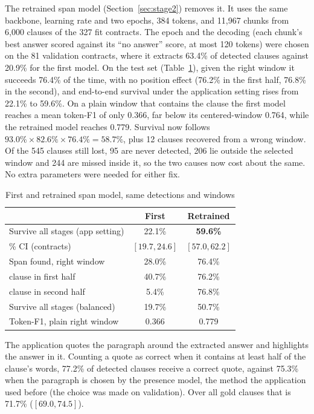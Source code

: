 \documentclass[journal]{IEEEtran}
\begin{document}
The retrained span model (Section~\ref{sec:stage2}) removes it. It uses the same backbone, learning
rate and two epochs, 384 tokens, and 11,967 chunks from 6,000 clauses of the 327 fit contracts. The
epoch and the decoding (each chunk's best answer scored against its ``no answer'' score, at most 120
tokens) were chosen on the 81 validation contracts, where it extracts 63.4\% of detected clauses
against 20.9\% for the first model. On the test set (Table~\ref{tab:spanv2}), given the right window
it succeeds 76.4\% of the time, with no position effect (76.2\% in the first half, 76.8\% in the
second), and end-to-end survival under the application setting rises from 22.1\% to 59.6\%. On a
plain window that contains the clause the first model reaches a mean token-F1 of only 0.366, far
below its centered-window 0.764, while the retrained model reaches 0.779. Survival now follows
$93.0\% \times 82.6\% \times 76.4\% = 58.7\%$, plus 12 clauses recovered from a wrong window. Of
the 545 clauses still lost, 95 are never detected, 206 lie outside the selected window and 244 are
missed inside it, so the two causes now cost about the same. No extra parameters were needed for
either fix.

\begin{table}[!t]
\caption{First and retrained span model, same detections and windows}
\label{tab:spanv2}
\centering
\small
\setlength{\tabcolsep}{4pt}
\begin{tabular}{lcc}
\toprule
 & \textbf{First} & \textbf{Retrained}\\
\midrule
Survive all stages (app setting) & 22.1\% & \textbf{59.6\%}\\
\quad 95\% CI (contracts) & $[19.7, 24.6]$ & $[57.0, 62.2]$\\
Span found, right window & 28.0\% & 76.4\%\\
\quad clause in first half & 40.7\% & 76.2\%\\
\quad clause in second half & 5.4\% & 76.8\%\\
Survive all stages (balanced) & 19.7\% & 50.7\%\\
Token-F1, plain right window & 0.366 & 0.779\\
\bottomrule
\end{tabular}
\end{table}

The application quotes the paragraph around the extracted answer and highlights the answer in it.
Counting a quote as correct when it contains at least half of the clause's words, 77.2\% of
detected clauses receive a correct quote, against 75.3\% when the paragraph is chosen by the presence
model, the method the application used before (the choice was made on validation). Over all gold
clauses that is 71.7\% ($[69.0, 74.5]$).
\end{document}
